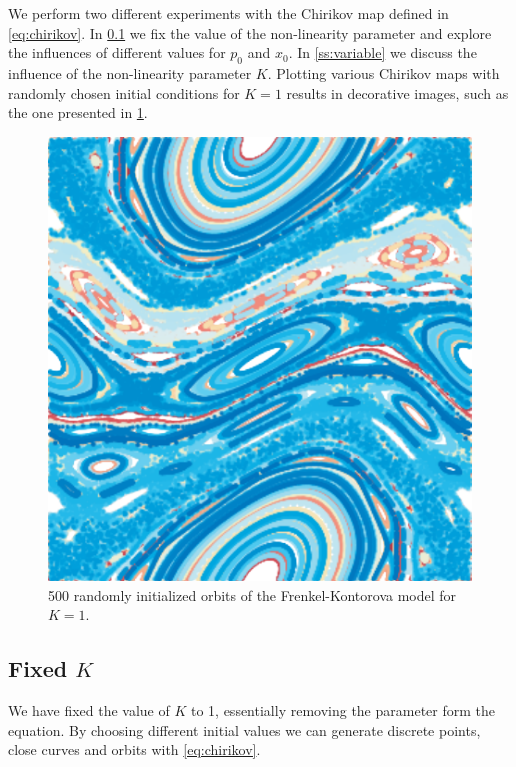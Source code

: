 We perform two different experiments with the Chirikov map defined in \cref{eq:chirikov}. In \cref{ss:fixed} we fix the value of the non-linearity parameter and explore the influences of different values for $p_0$ and $x_0$. In \cref{ss:variable} we discuss the influence of the non-linearity parameter $K$. Plotting various Chirikov maps with randomly chosen initial conditions for $K = 1$ results in decorative images, such as the one presented in \cref{fig:a:pretty}.

	\begin{figure}[b]
		\centering
		\includegraphics[width=0.9\columnwidth]{./img/assignment_a_pretty_low_res.pdf}
		\caption{500 randomly initialized orbits of the Frenkel-Kontorova model for $K = 1$.}
		\label{fig:a:pretty}
	\end{figure}

\subsection[]{Fixed $K$}
\label{ss:fixed}
	We have fixed the value of $K$ to 1, essentially removing the parameter form the equation. By choosing different initial values we can generate discrete points, close curves and orbits with \cref{eq:chirikov}.
	
